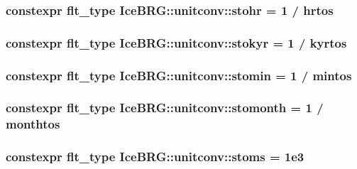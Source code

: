 \subsubsection[{stohr}]{\setlength{\rightskip}{0pt plus 5cm}constexpr {\bf flt\+\_\+type} Ice\+B\+R\+G\+::unitconv\+::stohr = 1 / {\bf hrtos}}\label{namespaceIceBRG_1_1unitconv_a6ad8f8ca37aa75dc5157627446570a2d}
\hypertarget{namespaceIceBRG_1_1unitconv_a45a3e219cdb1d207e3147921c1dbe58a}{}
\subsubsection[{stokyr}]{\setlength{\rightskip}{0pt plus 5cm}constexpr {\bf flt\+\_\+type} Ice\+B\+R\+G\+::unitconv\+::stokyr = 1 / {\bf kyrtos}}\label{namespaceIceBRG_1_1unitconv_a45a3e219cdb1d207e3147921c1dbe58a}
\hypertarget{namespaceIceBRG_1_1unitconv_a25a055b291d2174dcdc520c0971d7288}{}
\subsubsection[{stomin}]{\setlength{\rightskip}{0pt plus 5cm}constexpr {\bf flt\+\_\+type} Ice\+B\+R\+G\+::unitconv\+::stomin = 1 / {\bf mintos}}\label{namespaceIceBRG_1_1unitconv_a25a055b291d2174dcdc520c0971d7288}
\hypertarget{namespaceIceBRG_1_1unitconv_ae70e876896c92863e2901aba370754bb}{}
\subsubsection[{stomonth}]{\setlength{\rightskip}{0pt plus 5cm}constexpr {\bf flt\+\_\+type} Ice\+B\+R\+G\+::unitconv\+::stomonth = 1 / {\bf monthtos}}\label{namespaceIceBRG_1_1unitconv_ae70e876896c92863e2901aba370754bb}
\hypertarget{namespaceIceBRG_1_1unitconv_aa7e2d2815bb3181270217087581e9efd}{}
\subsubsection[{stoms}]{\setlength{\rightskip}{0pt plus 5cm}constexpr {\bf flt\+\_\+type} Ice\+B\+R\+G\+::unitconv\+::stoms = 1e3}\label{namespaceIceBRG_1_1unitconv_aa7e2d2815bb3181270217087581e9efd}
\hypertarget{namespaceIceBRG_1_1unitconv_a9f0f6ce103cd5bdd7d39eb0ce91bf5f9}{}

